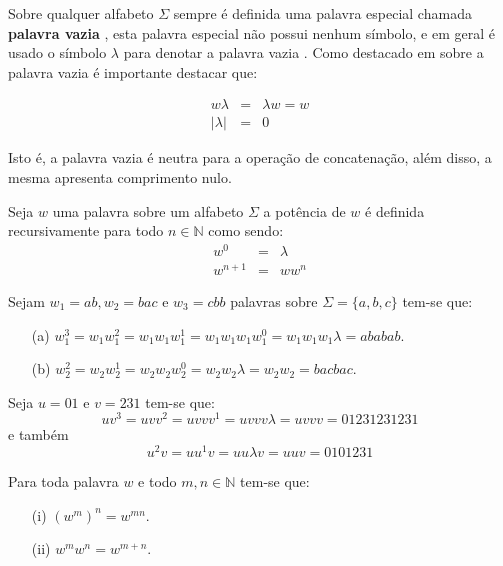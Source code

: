 Sobre qualquer alfabeto $\Sigma$ sempre é definida uma palavra especial chamada \textbf{palavra vazia} \cite{hopcroft2008, linz2006}, esta palavra especial não possui nenhum símbolo, e em geral é usado o símbolo $\lambda$ para denotar a palavra vazia \cite{benjaLivro2010, valdi2016master}. Como destacado em \cite{benjaLivro2010, valdi2020phd} sobre a palavra vazia é importante destacar que:

\begin{eqnarray}
	w\lambda & = & \lambda w = w\\
	|\lambda| & = &  0
\end{eqnarray}

Isto é, a palavra vazia é neutra para a operação de concatenação, além disso, a mesma apresenta comprimento nulo.

\begin{definition}\label{def:PotenciaPalavras}
	Seja $w$ uma palavra sobre um alfabeto $\Sigma$ a potência de $w$ é definida recursivamente para todo $n \in \mathbb{N}$ como sendo:
	\begin{eqnarray}
		w^0 & = & \lambda\\
		w^{n+1} & = & ww^{n}
	\end{eqnarray}
\end{definition}

\begin{exem}
	Sejam $w_1 = ab, w_2 = bac$ e $w_3 = cbb$ palavras sobre $\Sigma = \{a, b, c\}$ tem-se que:
	\begin{itemize}
		\item[(a)] $w_1^3 = w_1w_1^2 = w_1w_1w_1^1 = w_1w_1w_1w_1^0 = w_1w_1w_1\lambda = ababab$.
		\item[(b)] $w_2^2 = w_2w_2^1 = w_2w_2w_2^0 = w_2w_2\lambda = w_2w_2 = bacbac$.
	\end{itemize} 
\end{exem}

\begin{exem}
	Seja $u = 01$ e $v = 231$ tem-se que: 
	$$uv^3 = uvv^2 = uvvv^1 = uvvv\lambda = uvvv = 01231231231$$
	e também 
	$$u^2v = uu^1v = uu\lambda v = uuv = 0101231$$
\end{exem}

\begin{prop}
	Para toda palavra $w$ e todo $m,n \in \mathbb{N}$ tem-se que:
	\begin{itemize}
		\item[(i)] $(w^m)^n = w^{mn}$.
		\item[(ii)] $w^mw^n = w^{m+n}$.
	\end{itemize}
\end{prop}

